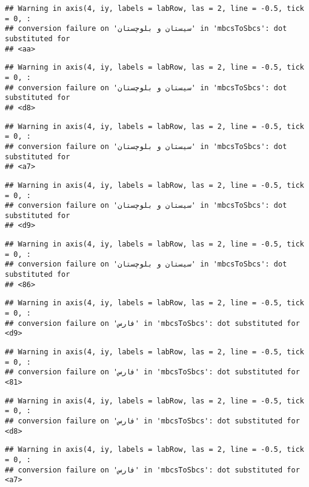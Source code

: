 \documentclass[
]{article}
\begin{document}
\begin{verbatim}
## Warning in axis(4, iy, labels = labRow, las = 2, line = -0.5, tick = 0, :
## conversion failure on 'سیستان و بلوچستان' in 'mbcsToSbcs': dot substituted for
## <aa>
\end{verbatim}

\begin{verbatim}
## Warning in axis(4, iy, labels = labRow, las = 2, line = -0.5, tick = 0, :
## conversion failure on 'سیستان و بلوچستان' in 'mbcsToSbcs': dot substituted for
## <d8>
\end{verbatim}

\begin{verbatim}
## Warning in axis(4, iy, labels = labRow, las = 2, line = -0.5, tick = 0, :
## conversion failure on 'سیستان و بلوچستان' in 'mbcsToSbcs': dot substituted for
## <a7>
\end{verbatim}

\begin{verbatim}
## Warning in axis(4, iy, labels = labRow, las = 2, line = -0.5, tick = 0, :
## conversion failure on 'سیستان و بلوچستان' in 'mbcsToSbcs': dot substituted for
## <d9>
\end{verbatim}

\begin{verbatim}
## Warning in axis(4, iy, labels = labRow, las = 2, line = -0.5, tick = 0, :
## conversion failure on 'سیستان و بلوچستان' in 'mbcsToSbcs': dot substituted for
## <86>
\end{verbatim}

\begin{verbatim}
## Warning in axis(4, iy, labels = labRow, las = 2, line = -0.5, tick = 0, :
## conversion failure on 'فارس' in 'mbcsToSbcs': dot substituted for <d9>
\end{verbatim}

\begin{verbatim}
## Warning in axis(4, iy, labels = labRow, las = 2, line = -0.5, tick = 0, :
## conversion failure on 'فارس' in 'mbcsToSbcs': dot substituted for <81>
\end{verbatim}

\begin{verbatim}
## Warning in axis(4, iy, labels = labRow, las = 2, line = -0.5, tick = 0, :
## conversion failure on 'فارس' in 'mbcsToSbcs': dot substituted for <d8>
\end{verbatim}

\begin{verbatim}
## Warning in axis(4, iy, labels = labRow, las = 2, line = -0.5, tick = 0, :
## conversion failure on 'فارس' in 'mbcsToSbcs': dot substituted for <a7>
\end{verbatim}
\end{document}
